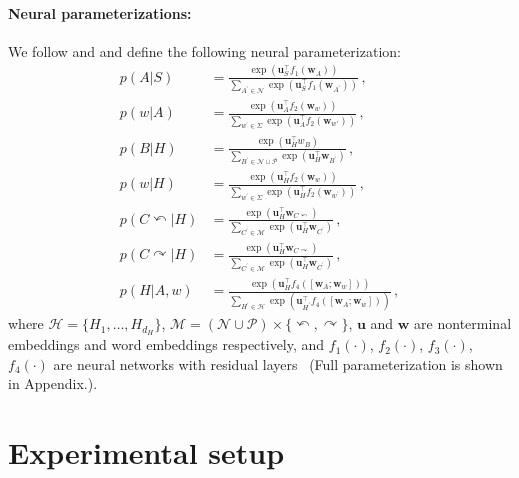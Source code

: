 \documentclass[11pt,a4paper]{article}
\newcommand{\mb}{\mathbf}
\begin{document}
\paragraph{Neural parameterizations:}
We follow \citet{kim-etal-2019-compound} and \citet{zhu-etal-2020-return} and define the following neural parameterization:
\begin{align*}
p( A|S) &= \frac{\exp (\mathbf{u}_{S}^{\top} f_1(\mb{w}_{A}))}{  \sum_{A^{\prime} \in \mathcal{N}} \exp (\mathbf{u}_{S}^{\top} f_1(\mb{w}_{A^{\prime}})) } \,,\\
p(w|A) &= \frac{\exp (\mathbf{u}_{A}^{\top} f_{2}( \mb{w}_{w}))}{  \sum_{w^{\prime} \in \Sigma} \exp (\mathbf{u}_{A}^{\top} f_{2}(\mb{w}_{w'}))}\,, \\
p(B | H) &= \frac{\exp (\mathbf{u}_{H}^{\top} w_{B})}{  \sum_{B^{\prime} \in \mathcal{N}\cup \mathcal{P}} \exp (\mathbf{u}_{H}^{\top} \mb{w}_{B^{\prime}}) } \,,\\
p(w|H) &= \frac{\exp (\mathbf{u}_{H}^{\top} f_2 ( \mb{w}_{w}) )}{  \sum_{w^{\prime} \in \Sigma} \exp (\mathbf{u}_{H}^{\top} f_2 ( \mb{w}_{w^{\prime}})) } \,, \\
p( C \curvearrowleft | H) &=  \frac{ \exp (\mathbf{u}_{H}^{\top} \mb{w}_{C\curvearrowleft})}{ \sum_{C^{\prime} \in \mathcal{M}} \exp (\mathbf{u}_{H}^{\top} \mb{w}_{C^{\prime}})  }  \,,\\
p(C \curvearrowright |H) &=  \frac{ \exp (\mathbf{u}_{H}^{\top} \mb{w}_{C\curvearrowright})}{ \sum_{C^{\prime} \in \mathcal{M}} \exp (\mathbf{u}_{H}^{\top} \mb{w}_{C^{\prime}})  } \,, \\
p( H|A, w) &=  \frac{ \exp (\mathbf{u}_{H}^{\top} f_{4}([\mathbf{w}_{A}; \mathbf{w}_{w}]) ) }{\sum_{H^{\prime} \in \mathcal{H}} \exp (\mathbf{u}_{H^{\prime}}^{\top} f_{4}([\mathbf{w}_{A}; \mathbf{w}_{w}])) } \,,
\end{align*}
where $\mathcal{H} = \{H_{1},\ldots,H_{d_H}\}$, $\mathcal{M} = (\mathcal{N}\cup\mathcal{P}) \times \{\curvearrowleft, \curvearrowright\}$,
$\mb{u}$ and $\mb{w}$ are nonterminal embeddings and word embeddings respectively,
and $f_1(\cdot)$, $f_2(\cdot)$, $f_3(\cdot)$, $f_4(\cdot)$ are neural networks with residual layers~\citep{he2016residual} (Full parameterization is shown in Appendix.).










\section{Experimental setup}
\end{document}
